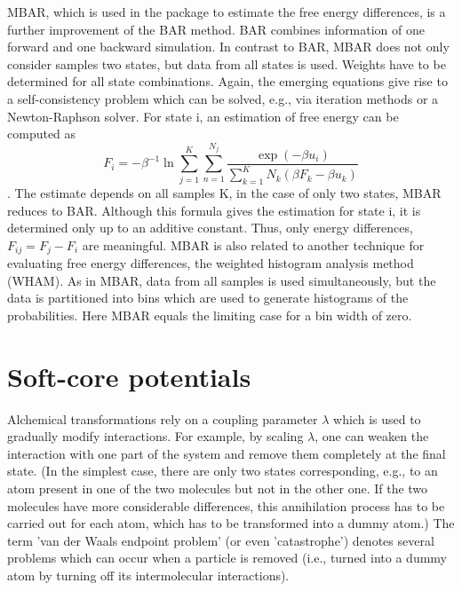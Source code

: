 MBAR, which is used in the {\trafo} package to estimate the free energy differences, is a further improvement of the BAR method. BAR combines information of one forward and one backward simulation.
In contrast to BAR, MBAR does not only consider samples two states, but data from all states is used.
Weights have to be determined for all state combinations. Again, the emerging equations give rise to a self-consistency problem which can be solved, e.g., via iteration methods or a Newton-Raphson solver. For state i, an estimation of free energy can be computed as \begin{equation}F_{i}=-\beta^{-1}\ln\mathop{\sum}_{j=1}^{K}\sum_{n=1}^{N_{j}}\frac{\exp\left(-\beta u_{i}\right)}{\sum_{k=1}^{K}N_{k}\left(\beta F_{k}-\beta u_{k}\right)}\end{equation}. 
The estimate depends on all samples K, in the case of only two states, MBAR reduces to BAR. Although this formula gives the estimation for state i, it is determined only up to an additive constant. Thus, only energy differences, \bigtriangleup $F_{ij}=F_{j}-F_{i}$ are meaningful. \cite{Shirts.2008} 
MBAR is also related to another technique for evaluating free energy differences, the weighted histogram analysis method (WHAM)\cite{Kumar.1992}. As in MBAR, data from all samples is used simultaneously, but the data is partitioned into bins which are used to generate histograms of the probabilities. Here MBAR equals the limiting case for a bin width of zero.\cite{Shirts.2008, Klimovich.2015} 

\section{Soft-core potentials}

Alchemical transformations rely on a coupling parameter $\lambda$ which
is used to gradually modify interactions. For example, by scaling $\lambda$, one can weaken the interaction with one part of the system and remove them completely at the final state. (In the simplest case,
there are only two states corresponding, e.g., to an atom present in
one of the two molecules but not in the other one. If the two molecules
have more considerable differences, this annihilation process has to be carried out for each atom, which has to be transformed
into a dummy atom.)
The term 'van der Waals endpoint problem' (or even 'catastrophe') denotes
several problems which can occur when a particle is removed (i.e.,
turned into a dummy atom by turning off its intermolecular interactions).
\cite{Boresch.2011}

